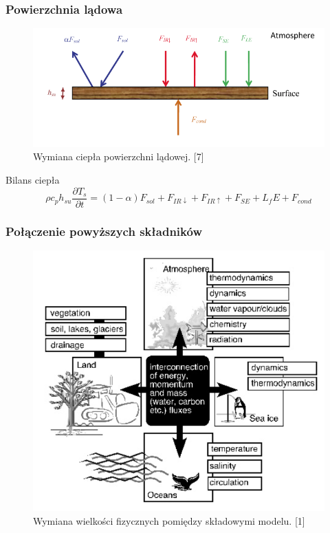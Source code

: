 \documentclass{beamer}
\begin{document}
\begin{frame}
	\frametitle{Powierzchnia lądowa}
			\begin{figure}[h]
				\begin{center}
					\includegraphics[width=0.8\linewidth]{images/lad.png}
					\caption{Wymiana ciepła powierzchni lądowej. [7]}
				\end{center}
			\end{figure}
	\begin{block}{Bilans ciepła}
		\[ \rho c_p h_{su} \frac{\partial T_s}{\partial t} = (1-\alpha)F_{sol} + F_{IR\downarrow} + F_{IR\uparrow} + F_{SE} + L_f E + F_{cond}
		\]
	\end{block}
	
	
\end{frame}




\begin{frame}
	\frametitle{Połączenie powyższych składników}
	\begin{figure}[h]
		\begin{center}
			\includegraphics[width=0.6\linewidth]{images/Figure6.png}
			\caption{Wymiana wielkości fizycznych pomiędzy składowymi modelu. [1]}
		\end{center}
	\end{figure}
\end{frame}
\end{document}
